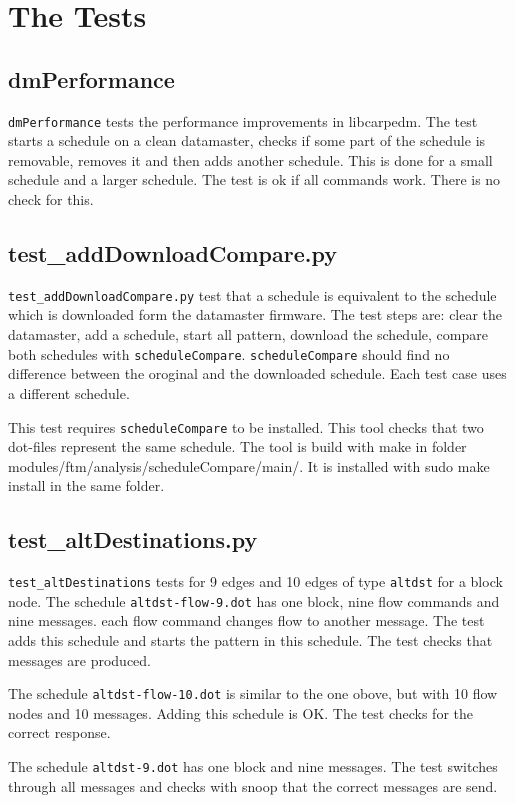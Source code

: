 \documentclass[12pt,a4paper]{report}
\begin{document}
\chapter{The Tests}
\section{dmPerformance}
\texttt{dmPerformance} tests the performance improvements in libcarpedm.
The test starts a schedule on a clean datamaster, checks if some part of
the schedule is removable, removes it and then adds another schedule.
This is done for a small schedule and a larger schedule. The test is ok
if all commands work. There is no check for this.

\section{test\_addDownloadCompare.py}
\texttt{test\_addDownloadCompare.py} test that a schedule is equivalent
to the schedule which is downloaded form the datamaster firmware.
The test steps are: clear the datamaster, add a schedule, start all
pattern, download the schedule, compare both schedules with
\texttt{scheduleCompare}. \texttt{scheduleCompare} should find no difference
between the oroginal and the downloaded schedule. Each test case uses a
different schedule.

This test requires \texttt{scheduleCompare} to be installed. This tool
checks that two dot-files represent the same schedule. The tool is build
with make in folder modules/ftm/analysis/scheduleCompare/main/.
It is installed with sudo make install in the same folder.

\section{test\_altDestinations.py}
\texttt{test\_altDestinations} tests for 9 edges and 10 edges of type
\texttt{altdst} for a block node.
The schedule \texttt{altdst-flow-9.dot} has one block, nine flow commands
and nine messages. each flow command changes flow to another message.
The test adds this schedule and starts the pattern in this schedule.
The test checks that messages are produced.

The schedule \texttt{altdst-flow-10.dot} is similar to the one obove,
but with 10 flow nodes and 10 messages. Adding this schedule is OK.
The test checks for the correct response.

The schedule \texttt{altdst-9.dot} has one block and nine messages.
The test switches through all messages and checks with snoop that the
correct messages are send.
\end{document}
